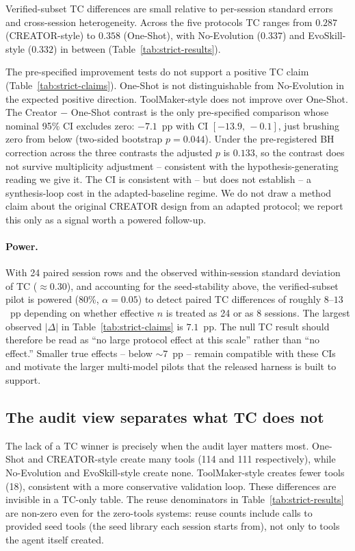 \documentclass[sigconf,anonymous,review,natbib=false]{acmart}
\begin{document}
Verified-subset TC differences are small relative to per-session standard errors and cross-session heterogeneity. Across the five protocols TC ranges from $0.287$ (CREATOR-style) to $0.358$ (One-Shot), with No-Evolution ($0.337$) and EvoSkill-style ($0.332$) in between (Table~\ref{tab:strict-results}).

The pre-specified improvement tests do not support a positive TC claim (Table~\ref{tab:strict-claims}). One-Shot is not distinguishable from No-Evolution in the expected positive direction. ToolMaker-style does not improve over One-Shot. The Creator $-$ One-Shot contrast is the only pre-specified comparison whose nominal 95\% CI excludes zero: $-7.1$~pp with CI $[-13.9,\,-0.1]$, just brushing zero from below (two-sided bootstrap $p{=}0.044$). Under the pre-registered BH correction across the three contrasts the adjusted $p$ is $0.133$, so the contrast does not survive multiplicity adjustment -- consistent with the hypothesis-generating reading we give it. The CI is consistent with -- but does not establish -- a synthesis-loop cost in the adapted-baseline regime. We do not draw a method claim about the original CREATOR design from an adapted protocol; we report this only as a signal worth a powered follow-up.



\paragraph{Power.} With 24 paired session rows and the observed within-session standard deviation of TC ($\approx 0.30$), and accounting for the seed-stability above, the verified-subset pilot is powered (80\%, $\alpha{=}0.05$) to detect paired TC differences of roughly $8$--$13$~pp depending on whether effective $n$ is treated as 24 or as 8 sessions. The largest observed $|\Delta|$ in Table~\ref{tab:strict-claims} is $7.1$~pp. The null TC result should therefore be read as ``no large protocol effect at this scale'' rather than ``no effect.'' Smaller true effects -- below $\sim 7$~pp -- remain compatible with these CIs and motivate the larger multi-model pilots that the released harness is built to support.

\subsection{The audit view separates what TC does not}

The lack of a TC winner is precisely when the audit layer matters most. One-Shot and CREATOR-style create many tools (114 and 111 respectively), while No-Evolution and EvoSkill-style create none. ToolMaker-style creates fewer tools (18), consistent with a more conservative validation loop. These differences are invisible in a TC-only table. The reuse denominators in Table~\ref{tab:strict-results} are non-zero even for the zero-tools systems: reuse counts include calls to provided seed tools (the seed library each session starts from), not only to tools the agent itself created.
\end{document}
